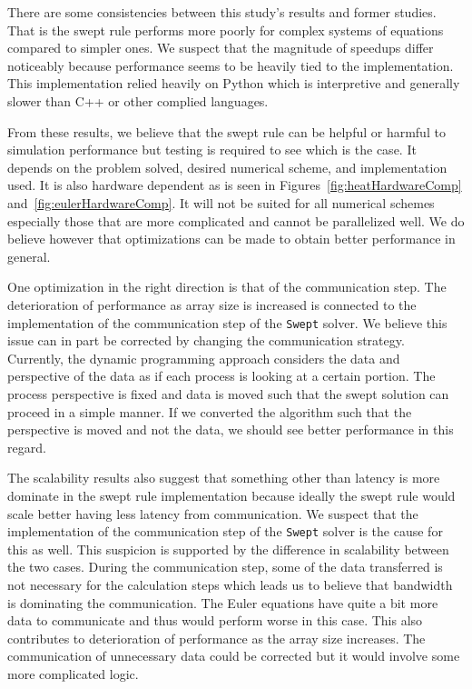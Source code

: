 \documentclass[review]{elsarticle}
\def\Swept{\texttt{Swept}}
\begin{document}
There are some consistencies between this study's results and former studies. That is the swept rule performs more poorly for complex systems of equations compared to simpler ones. We suspect that the magnitude of speedups differ noticeably because performance seems to be heavily tied to the implementation. This implementation relied heavily on Python which is interpretive and generally slower than C++ or other complied languages. 

From these results, we believe that the swept rule can be helpful or harmful to simulation performance but testing is required to see which is the case. It depends on the problem solved, desired numerical scheme, and implementation used. It is also hardware dependent as is seen in Figures~\ref{fig:heatHardwareComp} and~\ref{fig:eulerHardwareComp}. It will not be suited for all numerical schemes especially those that are more complicated and cannot be parallelized well. We do believe however that optimizations can be made to obtain better performance in general. 

One optimization in the right direction is that of the communication step. The deterioration of performance as array size is increased is connected to the implementation of the communication step of the \Swept{} solver. We believe this issue can in part be corrected by changing the communication strategy. Currently, the dynamic programming approach considers the data and perspective of the data as if each process is looking at a certain portion. The process perspective is fixed and data is moved such that the swept solution can proceed in a simple manner. If we converted the algorithm such that the perspective is moved and not the data, we should see better performance in this regard.

The scalability results also suggest that something other than latency is more dominate in the swept rule implementation because ideally the swept rule would scale better having less latency from communication. We suspect that the implementation of the communication step of the \Swept{} solver is the cause for this as well. This suspicion is supported by the difference in scalability between the two cases. During the communication step, some of the data transferred is not necessary for the calculation steps which leads us to believe that bandwidth is dominating the communication. The Euler equations have quite a bit more data to communicate and thus would perform worse in this case. This also contributes to deterioration of performance as the array size increases. The communication of unnecessary data could be corrected but it would involve some more complicated logic.
\end{document}
